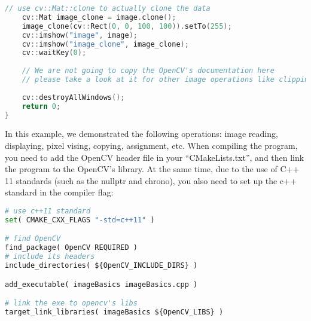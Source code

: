 \begin{lstlisting}[language=C++,caption=slambook/ch5/imageBasics/imageBasics.cpp]
    // use cv::Mat::clone to actually clone the data
    cv::Mat image_clone = image.clone();
    image_clone(cv::Rect(0, 0, 100, 100)).setTo(255);
    cv::imshow("image", image);
    cv::imshow("image_clone", image_clone);
    cv::waitKey(0);
    
    // We are not going to copy the OpenCV's documentation here
    // please take a look at it for other image operations like clipping, rotating and scaling.
    
    cv::destroyAllWindows();
    return 0;
}
\end{lstlisting}

In this example, we demonstrated the following operations: image reading, displaying, pixel vising, copying, assignment, etc. When compiling the program, you need to add the OpenCV header file in your ``CMakeLists.txt'', and then link the program to the OpenCV's library. At the same time, due to the use of C++ 11 standards (such as the nullptr and chrono), you also need to set up the c++ standard in the compiler flag:

\begin{lstlisting}[language=Python,caption=slambook/ch5/imageBasics/CMakeLists.txt]
# use c++11 standard
set( CMAKE_CXX_FLAGS "-std=c++11" )

# find OpenCV
find_package( OpenCV REQUIRED )
# include its headers
include_directories( ${OpenCV_INCLUDE_DIRS} )

add_executable( imageBasics imageBasics.cpp )

# link the exe to opencv's libs
target_link_libraries( imageBasics ${OpenCV_LIBS} )
\end{lstlisting}

